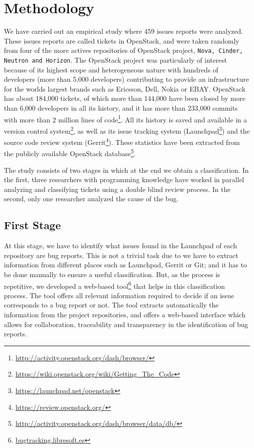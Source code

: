 \documentclass[ifip]{svmult}
\begin{document}
\section{Methodology}
\label{sec:methodology}

We have carried out an empirical study where 459 issues reports were analyzed. These issues reports are called tickets in OpenStack, and were taken randomly from four of the more actives repositories of OpenStack project, \texttt{Nova, Cinder, Neutron and Horizon}. The OpenStack project was particularly of interest because of its highest scope and heterogeneous nature with hundreds of developers (more than 5,000 developers) contributing to provide an infrastructure for the worlds largest brands such as Ericsson, Dell, Nokia or EBAY. OpenStack has about 184,000 tickets, of which more than 144,000 have been closed by more than 6,000 developers in all its history, and it has more than 233,000 commits with more than 2 million lines of code\footnote{\url{http://activity.openstack.org/dash/browser/}}. All its history is saved and available in a version control system\footnote{\url{https://wiki.openstack.org/wiki/Getting_The_Code}}, as well as its issue tracking system (Launchpad\footnote{\url{https://launchpad.net/openstack}}) and the source code review system (Gerrit\footnote{\url{https://review.openstack.org/}}). These statistics have been extracted from the publicly available OpenStack database\footnote{\url{http://activity.openstack.org/dash/browser/data/db/}}. 

The study consists of two stages in which at the end we obtain a classification. In the first, three researchers with programming knowledge have worked in parallel analyzing and classifying tickets using a double blind review process. In the second, only one researcher analyzed the cause of the bug.

\subsection{First Stage}
\label{subsec:first}

At this stage, we have to identify what issues found in the Launchpad of each repository are bug reports. This is not a trivial task due to we have to extract information from different places such as Launchpad, Gerrit or Git; and it has to be done manually to ensure a useful classification. But, as the process is repetitive, we developed a web-based tool\footnote{\url{bugtracking.libresoft.es}} that helps in this classification process. The tool offers all relevant information required to decide if an issue corresponds to a bug report or not. The tool extracts automatically the information from the project repositories, and offers a web-based interface which allows for collaboration, traceability and transparency in the identification of bug reports.
\end{document}
